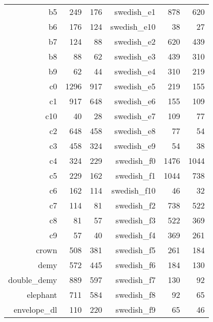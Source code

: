 \documentclass[a4paper,onecolumn,11pt]{book}
\begin{document}
\begin{figure}
\begin{tabular}{|rrr|rrr|}
                        b5 &    249 &    176 &       swedish\_e1 &    878 &    620 \\
                        b6 &    176 &    124 &      swedish\_e10 &     38 &     27 \\
                        b7 &    124 &     88 &       swedish\_e2 &    620 &    439 \\
                        b8 &     88 &     62 &       swedish\_e3 &    439 &    310 \\
                        b9 &     62 &     44 &       swedish\_e4 &    310 &    219 \\
                        c0 &   1296 &    917 &       swedish\_e5 &    219 &    155 \\
                        c1 &    917 &    648 &       swedish\_e6 &    155 &    109 \\
                       c10 &     40 &     28 &       swedish\_e7 &    109 &     77 \\
                        c2 &    648 &    458 &       swedish\_e8 &     77 &     54 \\
                        c3 &    458 &    324 &       swedish\_e9 &     54 &     38 \\
                        c4 &    324 &    229 &       swedish\_f0 &   1476 &   1044 \\
                        c5 &    229 &    162 &       swedish\_f1 &   1044 &    738 \\
                        c6 &    162 &    114 &      swedish\_f10 &     46 &     32 \\
                        c7 &    114 &     81 &       swedish\_f2 &    738 &    522 \\
                        c8 &     81 &     57 &       swedish\_f3 &    522 &    369 \\
                        c9 &     57 &     40 &       swedish\_f4 &    369 &    261 \\
                     crown &    508 &    381 &       swedish\_f5 &    261 &    184 \\
                      demy &    572 &    445 &       swedish\_f6 &    184 &    130 \\
               double\_demy &    889 &    597 &       swedish\_f7 &    130 &     92 \\
                  elephant &    711 &    584 &       swedish\_f8 &     92 &     65 \\
               envelope\_dl &    110 &    220 &       swedish\_f9 &     65 &     46 \\

\end{tabular}
\end{figure}
\end{document}
